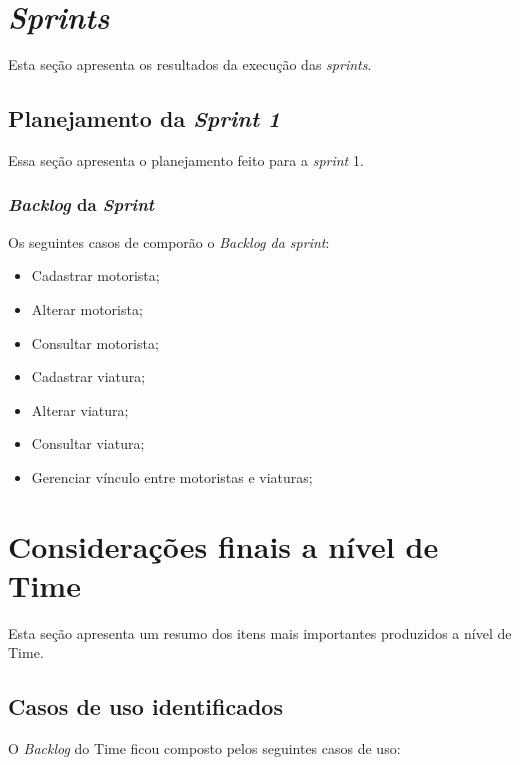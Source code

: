  \section{\textit{Sprints}}
    
    Esta seção apresenta os resultados da execução das \textit{sprints}.
    
    \subsection{Planejamento da \textit{Sprint 1}}
      
	Essa seção apresenta o planejamento feito para a \textit{sprint} 1.
      
      \subsubsection{\textit{Backlog} da \textit{Sprint}}
	
	Os seguintes casos de comporão o \textit{Backlog da sprint}:
	
	\begin{itemize}
	 \item Cadastrar motorista;
	 \item Alterar motorista;
	 \item Consultar motorista;
	 \item Cadastrar viatura;
	 \item Alterar viatura;
	 \item Consultar viatura;
	 \item Gerenciar vínculo entre motoristas e viaturas;
	\end{itemize}
  
  \section{Considerações finais a nível de Time}
    
    Esta seção apresenta um resumo dos itens mais importantes produzidos a nível de Time.
    
    \subsection{Casos de uso identificados} 
      
      O \textit{Backlog} do Time ficou composto pelos seguintes casos de uso:
      
      
